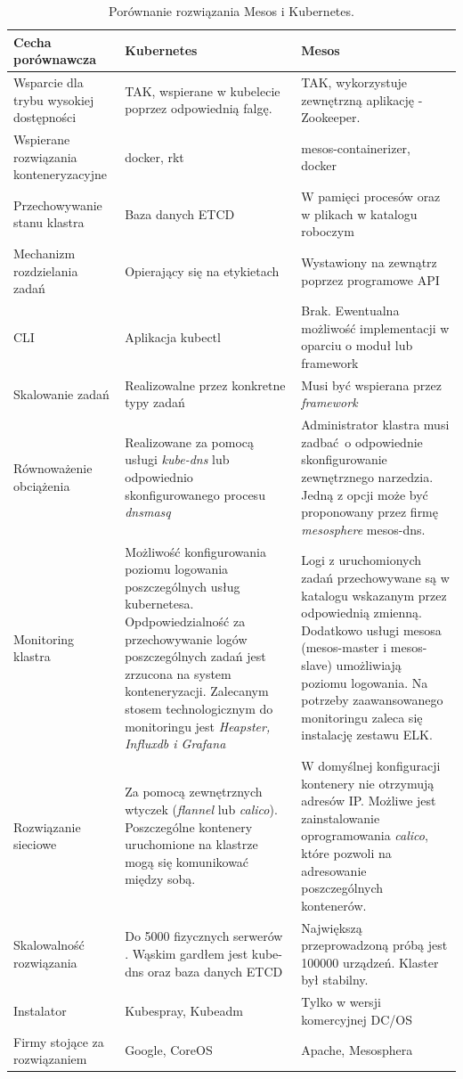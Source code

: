 \documentclass[10pt,a4paper,titlepage,twoside]{report}
\begin{document}
\begin{table}[!t]
\caption{Porównanie rozwiązania Mesos i Kubernetes.}
\label{k8s_mesos_comparision}
\centering
\begin{tabular}{|p{4cm}|p{6cm}|p{6cm}|}
  \hline
  \textbf{Cecha porównawcza} & \textbf{Kubernetes} & \textbf{Mesos}\\
  \hline
  Wsparcie dla trybu wysokiej dostępności & TAK, wspierane w kubelecie poprzez odpowiednią falgę. & TAK, wykorzystuje zewnętrzną aplikację - Zookeeper. \\
  \hline
  Wspierane rozwiązania konteneryzacyjne & docker, rkt & mesos-containerizer, docker \\
  \hline
  Przechowywanie stanu klastra & Baza danych ETCD & W pamięci procesów oraz w plikach w katalogu roboczym \\
  \hline
  Mechanizm rozdzielania zadań & Opierający się na etykietach & Wystawiony na zewnątrz poprzez programowe API \\
  \hline
  CLI & Aplikacja kubectl & Brak. Ewentualna możliwość implementacji w oparciu o moduł lub framework \\
  \hline
  Skalowanie zadań & Realizowalne przez konkretne typy zadań & Musi być wspierana przez \textit{framework}  \\
  \hline
  Równoważenie obciążenia & Realizowane za pomocą usługi \textit{kube-dns} lub odpowiednio skonfigurowanego procesu \textit{dnsmasq} & Administrator klastra musi zadbać o odpowiednie skonfigurowanie zewnętrznego narzedzia. Jedną z opcji może być proponowany przez firmę \textit{mesosphere} mesos-dns. \\
  \hline
  Monitoring klastra & Możliwość konfigurowania poziomu logowania poszczególnych usług kubernetesa. Opdpowiedzialność za przechowywanie logów poszczególnych zadań jest zrzucona na system konteneryzacji. Zalecanym stosem technologicznym do monitoringu jest \textit{Heapster, Influxdb i Grafana} & Logi z uruchomionych zadań przechowywane są w katalogu wskazanym przez odpowiednią zmienną. Dodatkowo usługi mesosa (mesos-master i mesos-slave) umożliwiają poziomu logowania. Na potrzeby zaawansowanego monitoringu zaleca się instalację zestawu ELK. \\
  \hline
  Rozwiązanie sieciowe & Za pomocą zewnętrznych wtyczek (\textit{flannel} lub \textit{calico}). Poszczególne kontenery uruchomione na klastrze mogą się komunikować między sobą. & W domyślnej konfiguracji kontenery nie otrzymują adresów IP. Możliwe jest zainstalowanie oprogramowania \textit{calico}, które pozwoli na adresowanie poszczególnych kontenerów.  \\
  \hline
  Skalowalność rozwiązania & Do 5000 fizycznych serwerów \cite{ad43}. Wąskim gardłem jest kube-dns oraz baza danych ETCD & Największą przeprowadzoną próbą jest 100000 urządzeń\cite{ad44}. Klaster był stabilny.\\
  \hline
  Instalator & Kubespray, Kubeadm & Tylko w wersji komercyjnej DC/OS \\
  \hline
  Firmy stojące za rozwiązaniem & Google, CoreOS & Apache, Mesosphera \\
  \hline
\end{tabular}
\end{table}
\end{document}
